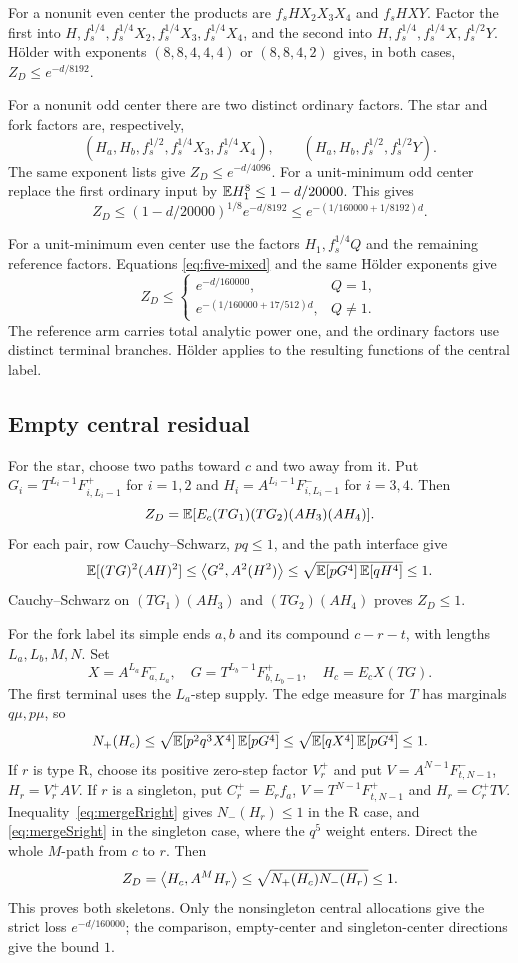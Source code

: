 For a nonunit even center the products are $f_sHX_2X_3X_4$ and
$f_sHXY$. Factor the first into
$H,f_s^{1/4},f_s^{1/4}X_2,f_s^{1/4}X_3,f_s^{1/4}X_4$,
and the second into $H,f_s^{1/4},f_s^{1/4}X,f_s^{1/2}Y$.
H\"older with exponents $(8,8,4,4,4)$ or $(8,8,4,2)$ gives, in both
cases, $Z_D\le e^{-d/8192}$.

For a nonunit odd center there are two distinct ordinary factors.
The star and fork factors are, respectively,
\[
 (H_a,H_b,f_s^{1/2},f_s^{1/4}X_3,f_s^{1/4}X_4),\qquad
 (H_a,H_b,f_s^{1/2},f_s^{1/2}Y).
\]
The same exponent lists give $Z_D\le e^{-d/4096}$.
For a unit-minimum odd center replace the first ordinary input by
$\mathbb E H_1^8\le1-d/20000$. This gives
\[
 Z_D\le (1-d/20000)^{1/8}e^{-d/8192}
       \le e^{-(1/160000+1/8192)d}.
\]

For a unit-minimum even center use the factors
$H_1,f_s^{1/4}Q$ and the remaining reference factors. Equations
\eqref{eq:five-mixed} and the same H\"older exponents give
\begin{equation}\label{eq:five-star-strict}
 Z_D\le
 \begin{cases}
 e^{-d/160000},&Q=1,\\
 e^{-(1/160000+17/512)d},&Q\ne1.
 \end{cases}
\end{equation}
The reference
arm carries total analytic power one, and the ordinary factors use
distinct terminal branches. H\"older applies to the resulting functions
of the central label.

\subsection{Empty central residual}
For the star, choose two paths toward $c$ and two away from it. Put
$G_i=T^{L_i-1}F^+_{i,L_i-1}$ for $i=1,2$ and
$H_i=A^{L_i-1}F^-_{i,L_i-1}$ for $i=3,4$. Then
\[
 Z_D=\mathbb E[E_c(TG_1)(TG_2)(AH_3)(AH_4)].
\]
For each pair, row Cauchy--Schwarz, $pq\le1$, and the path interface give
\[
 \mathbb E[(TG)^2(AH)^2]
 \le\left\langle G^2,A^2(H^2)\right\rangle
 \le\sqrt{\mathbb E[pG^4]\,\mathbb E[qH^4]}\le1.
\]
Cauchy--Schwarz on $(TG_1)(AH_3)$ and $(TG_2)(AH_4)$ proves $Z_D\le1$.

For the fork label its simple ends $a,b$ and its compound $c-r-t$,
with lengths $L_a,L_b,M,N$. Set
\[
 X=A^{L_a}F^-_{a,L_a},\quad
 G=T^{L_b-1}F^+_{b,L_b-1},\quad H_c=E_cX(TG).
\]
The first terminal uses the $L_a$-step supply. The edge measure
for $T$ has marginals $q\mu,p\mu$, so
\[
 N_+(H_c)\le\sqrt{\mathbb E[p^2q^3X^4]\,\mathbb E[pG^4]}
             \le\sqrt{\mathbb E[qX^4]\,\mathbb E[pG^4]}\le1.
\]
If $r$ is type R, choose its positive zero-step factor $V_r^+$ and put
$V=A^{N-1}F^-_{t,N-1}$, $H_r=V_r^+AV$. If $r$ is a singleton,
put $C_r^+=E_rf_a$, $V=T^{N-1}F^+_{t,N-1}$ and $H_r=C_r^+TV$.
Inequality~\eqref{eq:mergeRright} gives $N_-(H_r)\le1$ in the R case, and
\eqref{eq:mergeSright} in the singleton case, where the $q^5$ weight enters.
Direct the whole $M$-path from $c$ to $r$. Then
\[
 Z_D=\left\langle H_c,A^MH_r\right\rangle\le\sqrt{N_+(H_c)N_-(H_r)}\le1.
\]
This proves both skeletons. Only the
nonsingleton central allocations give the strict loss $e^{-d/160000}$;
the comparison, empty-center and singleton-center directions give the
bound $1$.
